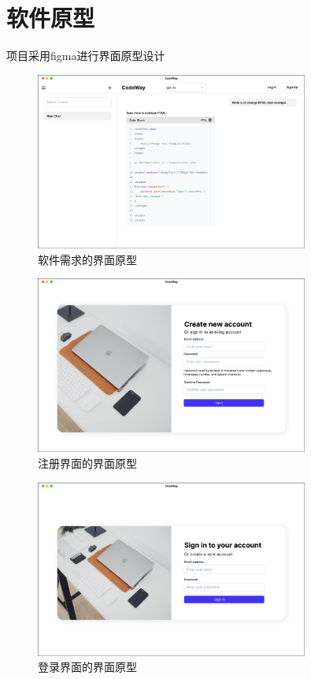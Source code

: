 \documentclass[
    report,     %
    oneside,    %
    UTF8,       %
    zihao=-4    %
]{config} %
\begin{document}
\section{软件原型}
项目采用figma进行界面原型设计
\begin{figure}[H]
    \centering
    \includegraphics[width=0.8\textwidth]{figures/figma.pdf}
    \caption{软件需求的界面原型}
    \label{fig:figma}
\end{figure}
\begin{figure}[H]
    \centering
    \includegraphics[width=0.8\textwidth]{figures/signup.pdf}
    \caption{注册界面的界面原型}
    \label{fig:signup}
\end{figure}
\begin{figure}[H]
    \centering
    \includegraphics[width=0.8\textwidth]{figures/login.pdf}
    \caption{登录界面的界面原型}
    \label{fig:login}
\end{figure}
\end{document}
